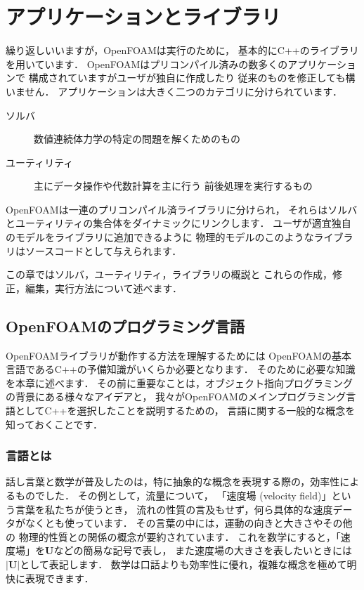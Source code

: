 \chapter{アプリケーションとライブラリ}
\label{chap:3}
%
%
%
%
繰り返しいいますが，OpenFOAMは実行のために，
基本的にC++のライブラリを用いています．
OpenFOAMはプリコンパイル済みの数多くのアプリケーションで
構成されていますがユーザが独自に作成したり
従来のものを修正しても構いません．
アプリケーションは大きく二つのカテゴリに分けられています．
\begin{description}
 \item[ソルバ] 数値連続体力学の特定の問題を解くためのもの
 \item[ユーティリティ] 主にデータ操作や代数計算を主に行う
            前後処理を実行するもの
\end{description}
OpenFOAMは一連のプリコンパイル済ライブラリに分けられ，
それらはソルバとユーティリティの集合体をダイナミックにリンクします．
ユーザが適宜独自のモデルをライブラリに追加できるように
物理的モデルのこのようなライブラリはソースコードとして与えられます．

この章ではソルバ，ユーティリティ，ライブラリの概説と
これらの作成，修正，編集，実行方法について述べます．



\section{OpenFOAMのプログラミング言語}
\label{sec:3.1}
OpenFOAMライブラリが動作する方法を理解するためには
OpenFOAMの基本言語であるC++の予備知識がいくらか必要となります．
そのために必要な知識を本章に述べます．
その前に重要なことは，オブジェクト指向プログラミングの背景にある様々なアイデアと，
我々がOpenFOAMのメインプログラミング言語としてC++を選択したことを説明するための，
言語に関する一般的な概念を知っておくことです．


\subsection{言語とは}
\label{ssec:3.1.1}
話し言葉と数学が普及したのは，特に抽象的な概念を表現する際の，効率性によるものでした．
その例として，流量について，
「速度場 (velocity field)」という言葉を私たちが使うとき，
流れの性質の言及もせず，何ら具体的な速度データがなくとも使っています．
その言葉の中には，運動の向きと大きさやその他の
物理的性質との関係の概念が要約されています．
これを数学にすると，「速度場」を$\bm{U}$などの簡易な記号で表し，
また速度場の大きさを表したいときには$|\bm{U}|$として表記します．
数学は口話よりも効率性に優れ，複雑な概念を極めて明快に表現できます．

